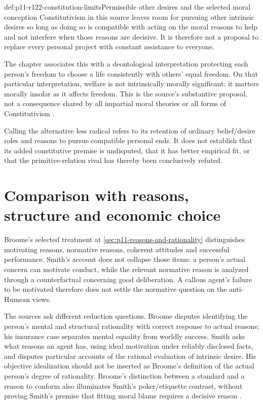 \begin{hbconvention}{def:p11-r122-constitution-limits}{Permissible other desires and the selected moral conception}
Constitutivism in this source leaves room for pursuing other intrinsic
desires so long as doing so is compatible with acting on the moral
reasons to help and not interfere when those reasons are decisive.
It is therefore not a proposal to replace every personal project with
constant assistance to everyone.

The chapter associates this with a deontological interpretation protecting
each person's freedom to choose a life consistently with others' equal
freedom. On that particular interpretation, welfare is not intrinsically
morally significant: it matters morally insofar as it affects freedom.
This is the source's substantive proposal, not a consequence shared by
all impartial moral theories or all forms of Constitutivism
\parencite[p.~700]{Smith2021MoralReasons}.
\end{hbconvention}

Calling the alternative less radical refers to its retention of ordinary
belief/desire roles and reasons to pursue compatible personal ends. It
does not establish that its added constitutive premise is undisputed,
that it has better empirical fit, or that the primitive-relation rival
has thereby been conclusively refuted.

\section{Comparison with reasons, structure and economic choice}
\label{sec:p11-r122-comparisons}

Broome's selected treatment at \cref{sec:p11-reasons-and-rationality}
distinguishes motivating reasons, normative reasons, coherent attitudes
and successful performance. Smith's account does not collapse those
items: a person's actual concern can motivate conduct, while the
relevant normative reason is analyzed through a counterfactual concerning
good deliberation. A callous agent's failure to be motivated therefore
does not settle the normative question on the anti-Humean views.

The sources ask different reduction questions. Broome disputes identifying
the person's mental and structural rationality with correct response to
actual reasons; his insurance case separates mental equality from
worldly success. Smith asks what reasons an agent has, using ideal
motivation under reliably disclosed facts, and disputes particular
accounts of the rational evaluation of intrinsic desire. His objective
idealization should not be inserted as Broome's definition of the actual
person's degree of rationality. Broome's distinction between a standard
and a reason to conform also illuminates Smith's poker/etiquette contrast,
without proving Smith's premise that fitting moral blame requires a
decisive reason \parencite[pp.~693--697]{Smith2021MoralReasons}.

